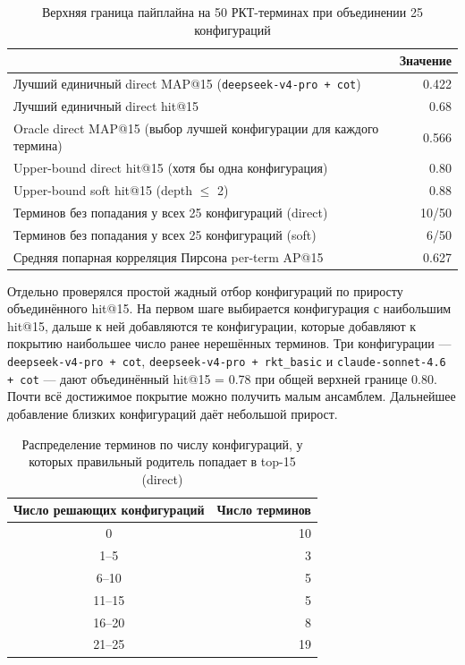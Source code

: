\documentclass[12pt,a4paper,oneside,openany]{report}
\begin{document}
\begin{table}[H]
\centering
\caption{Верхняя граница пайплайна на 50 РКТ-терминах при объединении 25 конфигураций}
\label{tab:upper_bound}
\begin{tabular}{p{115mm}r}
\toprule
 & Значение \\
\midrule
Лучший единичный direct MAP@15 (\texttt{deepseek-v4-pro + cot}) & 0.422 \\
Лучший единичный direct hit@15 & 0.68 \\
Oracle direct MAP@15 (выбор лучшей конфигурации для каждого термина) & 0.566 \\
Upper-bound direct hit@15 (хотя бы одна конфигурация) & 0.80 \\
Upper-bound soft hit@15 (depth $\leq$ 2) & 0.88 \\
Терминов без попадания у всех 25 конфигураций (direct) & 10/50 \\
Терминов без попадания у всех 25 конфигураций (soft) & 6/50 \\
Средняя попарная корреляция Пирсона per-term AP@15 & 0.627 \\
\bottomrule
\end{tabular}
\end{table}

Отдельно проверялся простой жадный отбор конфигураций по приросту объединённого hit@15. На первом шаге выбирается конфигурация с наибольшим hit@15, дальше к ней добавляются те конфигурации, которые добавляют к покрытию наибольшее число ранее нерешённых терминов. Три конфигурации — \texttt{deepseek-v4-pro + cot}, \texttt{deepseek-v4-pro + rkt\_basic} и \texttt{claude-sonnet-4.6 + cot} — дают объединённый hit@15 = 0.78 при общей верхней границе 0.80. Почти всё достижимое покрытие можно получить малым ансамблем. Дальнейшее добавление близких конфигураций даёт небольшой прирост.

\begin{table}[H]
\centering
\caption{Распределение терминов по числу конфигураций, у которых правильный родитель попадает в top-15 (direct)}
\label{tab:term_difficulty}
\begin{tabular}{cr}
\toprule
Число решающих конфигураций & Число терминов \\
\midrule
0      & 10 \\
1--5   &  3 \\
6--10  &  5 \\
11--15 &  5 \\
16--20 &  8 \\
21--25 & 19 \\
\bottomrule
\end{tabular}
\end{table}
\end{document}
